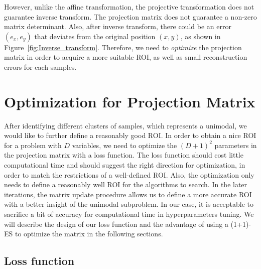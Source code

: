 However, unlike the affine transformation, the projective transformation does not guarantee inverse transform.
The projection matrix does not guarantee a non-zero matrix determinant.
Also, after inverse transform, 
there could be an error $(e_x, e_y)$ that deviates from the original position $(x, y)$, as shown in Figure~\ref{fig:Inverse_transform}.
Therefore, we need to \textit{optimize} the projection matrix in order to acquire a more suitable ROI, 
as well as small reconstruction errors for each samples.





\section{Optimization for Projection Matrix}

After identifying different clusters of samples, which represents a unimodal, 
we would like to further define a reasonably good ROI.
In order to obtain a nice ROI for a problem with $D$ variables, 
we need to optimize the $(D+1)^2$ parameters in the projection matrix with a loss function.
The loss function should cost little computational time and should suggest the right direction for optimization, 
in order to match the restrictions of a well-defined ROI.
Also, the optimization only needs to define a reasonably well ROI for the algorithms to search.  
In the later iterations, the matrix update procedure allows us to define a more accurate ROI with a better insight of the unimodal subproblem.
In our case, it is acceptable to sacrifice a bit of accuracy for computational time in hyperparameters tuning.  
We will describe the design of our loss function and the advantage of using a (1+1)-ES to optimize the matrix in the following sections.  


\subsection{Loss function}

